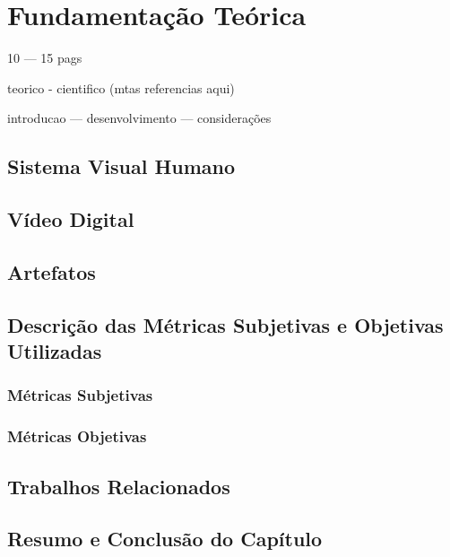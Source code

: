 
\chapter{Fundamentação Teórica}
10 --- 15 pags

teorico - cientifico (mtas referencias aqui)

introducao --- desenvolvimento --- considerações
\section{Sistema Visual Humano}

\section{Vídeo Digital}

\section{Artefatos}

\section{Descrição das Métricas Subjetivas e Objetivas Utilizadas}
\subsection{Métricas Subjetivas}
\subsection{Métricas Objetivas}

\section{Trabalhos Relacionados}

\section{Resumo e Conclusão do Capítulo}

